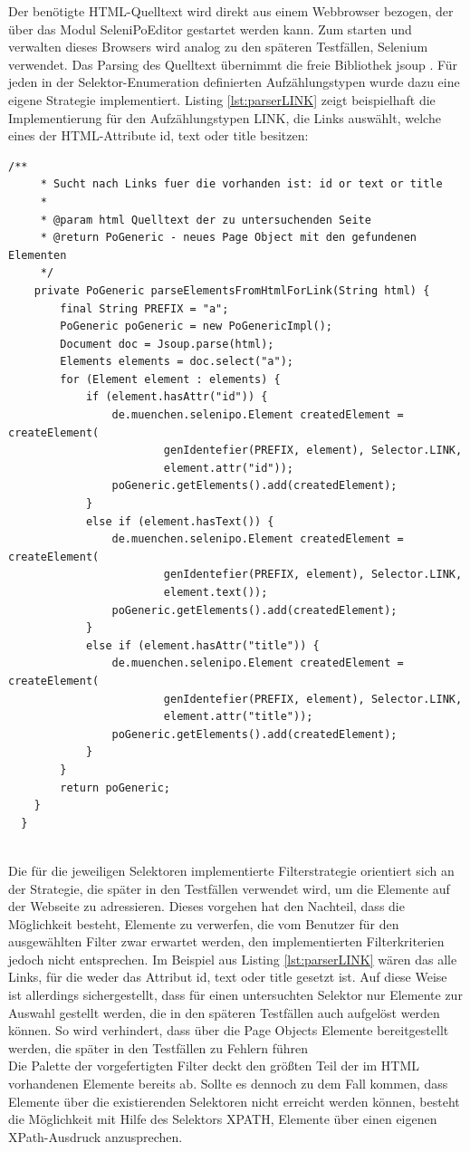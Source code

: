 Der benötigte HTML-Quelltext wird direkt aus einem Webbrowser bezogen, der über das Modul SeleniPoEditor gestartet werden kann. Zum starten und verwalten dieses Browsers wird analog zu den späteren Testfällen, Selenium verwendet.
Das Parsing des Quelltext übernimmt die freie Bibliothek jsoup \cite{hedley_jsoup_2015}.
Für jeden in der Selektor-Enumeration definierten Aufzählungstypen wurde dazu eine eigene Strategie implementiert.
Listing \ref{lst:parserLINK} zeigt beispielhaft die Implementierung für den Aufzählungstypen LINK, die Links auswählt, welche eines der HTML-Attribute id, text oder title besitzen:
\begin{lstlisting}[caption={Parser für den Aufzählungstypen LINK},label={lst:parserLINK}]
 	/**
	 * Sucht nach Links fuer die vorhanden ist: id or text or title
	 *
	 * @param html Quelltext der zu untersuchenden Seite
	 * @return PoGeneric - neues Page Object mit den gefundenen Elementen
	 */
	private PoGeneric parseElementsFromHtmlForLink(String html) {
		final String PREFIX = "a";
		PoGeneric poGeneric = new PoGenericImpl();
		Document doc = Jsoup.parse(html);
		Elements elements = doc.select("a");
		for (Element element : elements) {
			if (element.hasAttr("id")) {
				de.muenchen.selenipo.Element createdElement = createElement(
						genIdentefier(PREFIX, element), Selector.LINK,
						element.attr("id"));
				poGeneric.getElements().add(createdElement);
			}
			else if (element.hasText()) {
				de.muenchen.selenipo.Element createdElement = createElement(
						genIdentefier(PREFIX, element), Selector.LINK,
						element.text());
				poGeneric.getElements().add(createdElement);
			}
			else if (element.hasAttr("title")) {
				de.muenchen.selenipo.Element createdElement = createElement(
						genIdentefier(PREFIX, element), Selector.LINK,
						element.attr("title"));
				poGeneric.getElements().add(createdElement);
			}
		}
		return poGeneric;
	}
  }
  
\end{lstlisting} 

Die für die jeweiligen Selektoren implementierte Filterstrategie orientiert sich an der Strategie, die später in den Testfällen verwendet wird, um die Elemente auf der Webseite zu adressieren.
Dieses vorgehen hat den Nachteil, dass die Möglichkeit besteht, Elemente zu verwerfen, die vom Benutzer für den ausgewählten Filter zwar erwartet werden, den implementierten Filterkriterien jedoch nicht entsprechen.
Im Beispiel aus Listing \ref{lst:parserLINK} wären das alle Links, für die weder das Attribut id, text oder title gesetzt ist.
Auf diese Weise ist allerdings sichergestellt, dass für einen untersuchten Selektor nur Elemente zur Auswahl gestellt werden, die in den späteren Testfällen auch aufgelöst werden können. So wird verhindert, dass über die Page Objects Elemente bereitgestellt werden, die später in den Testfällen zu Fehlern führen\\
Die Palette der vorgefertigten Filter deckt den größten Teil der im HTML vorhandenen Elemente bereits ab. Sollte es dennoch zu dem Fall kommen, dass Elemente über die existierenden Selektoren nicht erreicht werden können, besteht die Möglichkeit mit Hilfe des Selektors XPATH, Elemente über einen eigenen XPath-Ausdruck anzusprechen.



